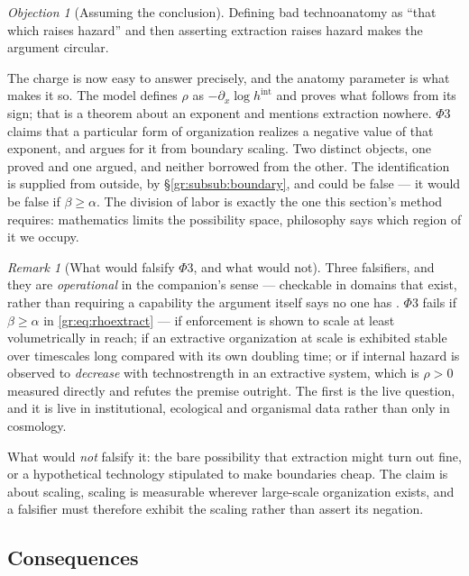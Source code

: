 \documentclass[11pt]{article}
\numberwithin{equation}{section}
\theoremstyle{plain}
\theoremstyle{definition}
\theoremstyle{remark}
\newtheorem{remark}[theorem]{Remark}
\newtheorem{objection}[theorem]{Objection}
\begin{document}
\begin{objection}[Assuming the conclusion]\label{gr:obj:circular}
Defining bad technoanatomy as ``that which raises hazard'' and then
asserting extraction raises hazard makes the argument circular.
\end{objection}

\noindent The charge is now easy to answer precisely, and the anatomy
parameter is what makes it so. The model defines $\rho$ as
$-\partial_x\log h^{\mathrm{int}}$ and proves what follows from its
sign; that is a theorem about an exponent and mentions extraction
nowhere. $\Phi3$ claims that a particular form of organization realizes
a negative value of that exponent, and argues for it from boundary
scaling. Two distinct objects, one proved and one argued, and neither
borrowed from the other. The identification is supplied from outside,
by \S\ref{gr:subsub:boundary}, and could be false --- it would be false
if $\beta\ge\alpha$. The division of labor is exactly the one this section's method
requires: mathematics limits the possibility space, philosophy says
which region of it we occupy.

\begin{remark}[What would falsify $\Phi3$, and what would not]
\label{gr:rem:falsify}
Three falsifiers, and they are \emph{operational} in the companion's
sense --- checkable in domains that exist, rather than requiring a
capability the argument itself says no one has \cite{Ben26Optimal}.
$\Phi3$ fails if $\beta\ge\alpha$ in \eqref{gr:eq:rhoextract} --- if
enforcement is shown to scale at least volumetrically in reach; if an
extractive organization at scale is exhibited stable over timescales
long compared with its own doubling time; or if internal hazard is
observed to \emph{decrease} with technostrength in an extractive system,
which is $\rho>0$ measured directly and refutes the premise outright. The first
is the live question, and it is live in institutional, ecological and
organismal data rather than only in cosmology.

What would \emph{not} falsify it: the bare possibility that extraction
might turn out fine, or a hypothetical technology stipulated to make
boundaries cheap. The claim is about scaling, scaling is measurable
wherever large-scale organization exists, and a falsifier must therefore
exhibit the scaling rather than assert its negation.
\end{remark}

\subsection{Consequences}\label{gr:sub:consequences}
\end{document}
